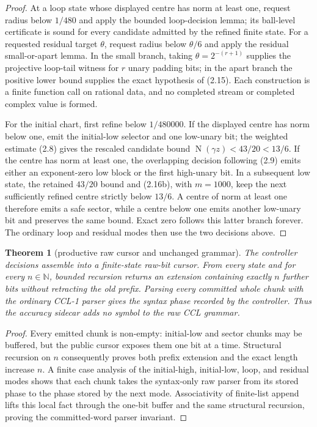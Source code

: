 \documentclass[10pt]{article}
\newtheorem{theorem}{Theorem}[section]
\theoremstyle{definition}
\theoremstyle{remark}
\newcommand{\N}{\mathbb{N}}
\newcommand{\Norm}{\operatorname{N}}
\begin{document}
\begin{proof}
At a loop state whose displayed centre has norm at least one, request radius
below $1/480$ and apply the bounded loop-decision lemma; its ball-level
certificate is sound for every candidate admitted by the refined finite
state.  For a requested residual target $\theta$, request radius below
$\theta/6$ and apply the residual small-or-apart lemma.  In the
small branch, taking $\theta=2^{-(r+1)}$ supplies the projective loop-tail
witness for $r$ unary padding bits; in the apart branch the positive lower
bound supplies the exact hypothesis of (2.15).  Each construction is a
finite function call on rational data, and no completed stream or completed
complex value is formed.

For the initial chart, first refine below $1/480000$.  If the displayed centre
has norm below one, emit the initial-low selector and one low-unary bit; the
weighted estimate (2.8) gives the rescaled candidate bound
$\Norm(\gamma z)<43/20<13/6$.  If the centre has norm at least one, the
overlapping decision following (2.9) emits either an exponent-zero low block
or the first high-unary bit.  In a subsequent low state, the retained
$43/20$ bound and (2.16b), with $m=1000$, keep the next sufficiently refined
centre strictly below $13/6$.  A centre of norm at least one therefore emits
a safe sector, while a centre below one emits another low-unary bit and
preserves the same bound.  Exact zero follows this latter branch forever.
The ordinary loop and residual modes then use the two decisions above.
\end{proof}

\begin{theorem}[productive raw cursor and unchanged grammar]
The controller decisions assemble into a finite-state raw-bit cursor.  From
every state and for every $n\in\N$, bounded recursion returns an extension
containing exactly $n$ further bits without retracting the old prefix.
Parsing every committed whole chunk with the ordinary CCL-1 parser gives the
syntax phase recorded by the controller.  Thus the accuracy sidecar adds no
symbol to the raw CCL grammar.
\end{theorem}

\begin{proof}
Every emitted chunk is non-empty: initial-low and sector chunks may be
buffered, but the public cursor exposes them one bit at a time.  Structural
recursion on $n$ consequently proves both prefix extension and the exact
length increase $n$.  A finite case analysis of the initial-high,
initial-low, loop, and residual modes shows that each chunk takes the
syntax-only raw parser from its stored phase to the phase stored by the next
mode.  Associativity of finite-list append lifts this local fact through the
one-bit buffer and the same structural recursion, proving the committed-word
parser invariant.
\end{proof}
\end{document}
